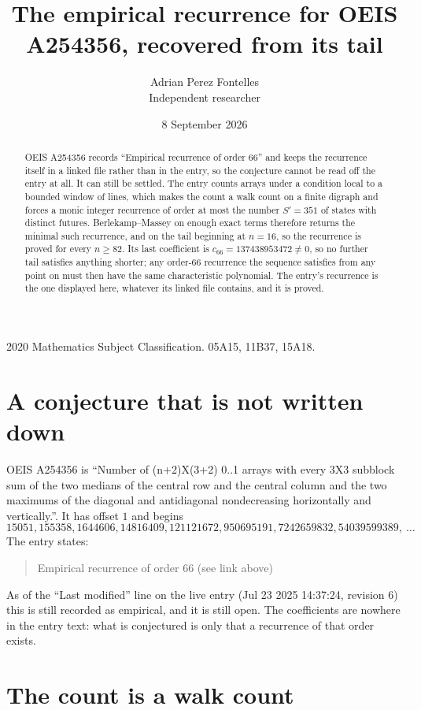 \documentclass[11pt,a4paper]{article}
\title{The empirical recurrence for OEIS A254356, recovered from its tail}
\author{Adrian Perez Fontelles\\ \small Independent researcher}
\date{8 September 2026}
\theoremstyle{plain}
\theoremstyle{definition}
\begin{document}
\maketitle

\begin{abstract}
OEIS A254356 records ``Empirical recurrence of order $66$'' and keeps the recurrence itself in
a linked file rather than in the entry, so the conjecture cannot be read off the entry at all.
It can still be settled. The entry counts arrays under a condition local to a bounded window of
lines, which makes the count a walk count on a finite digraph and forces a monic integer
recurrence of order at most the number $S'=351$ of states with distinct futures. Berlekamp--Massey on
enough exact terms therefore returns the minimal such recurrence, and on the tail beginning at $n=16$, so the recurrence is proved for every $n\ge82$.
Its last coefficient is $c_{66}=137438953472\neq0$, so no further tail satisfies anything
shorter; any order-$66$ recurrence the sequence satisfies from any point on must then have
the same characteristic polynomial. The entry's recurrence is the one displayed here, whatever
its linked file contains, and it is proved.
\end{abstract}

\noindent\small 2020 Mathematics Subject Classification. 05A15, 11B37, 15A18.\normalsize

\section{A conjecture that is not written down}

OEIS A254356 is ``Number of (n+2)X(3+2) 0..1 arrays with every 3X3 subblock sum of the two medians of the central row and the central column and the two maximums of the diagonal and antidiagonal nondecreasing horizontally and vertically.''. It has offset $1$ and begins
\[
15051, 155358, 1644606, 14816409, 121121672, 950695191, 7242659832, 54039599389,\ \dots
\]
The entry states:
\begin{quote}
Empirical recurrence of order 66 (see link above)
\end{quote}
As of the ``Last modified'' line on the live entry (Jul 23 2025 14:37:24, revision 6)
this is still recorded as empirical, and it is still open. The coefficients are nowhere in the
entry text: what is conjectured is only that a recurrence of that order exists.

\section{The count is a walk count}
\end{document}
